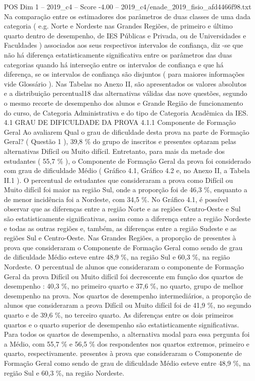 \begin{textsample}{POS Dim 1 – 2019\_c4 – Score -4.00 – 2019\_c4/enade\_2019\_fisio\_afd4466f98.txt}
Na comparação entre os estimadores dos parâmetros de duas classes de uma dada categoria ( e.g.
Norte e Nordeste nas Grandes Regiões, de primeiro e último quarto dentro de desempenho, de IES Públicas e Privada, ou de Universidades e Faculdades ) associados aos seus respectivos intervalos de confiança, diz -se que não há diferença estatisticamente significativa entre os parâmetros das duas categorias quando há interseção entre os intervalos de confiança e que há diferença, se os intervalos de confiança são disjuntos ( para maiores informações vide Glossário ).
Nas Tabelas no Anexo II, são apresentados os valores absolutos e a distribuição percentual18 das alternativas válidas das nove questões, segundo o mesmo recorte de desempenho dos alunos e Grande Região de funcionamento do curso, de Categoria Administrativa e do tipo de Categoria Acadêmica da IES. 4.1 GRAU DE DIFICULDADE DA PROVA 4.1.1 Componente de Formação Geral Ao avaliarem Qual o grau de dificuldade desta prova na parte de Formação Geral? ( Questão 1 ), 39,8 \% do grupo de inscritos e presentes optaram pelas alternativas Difícil ou Muito difícil.
Entretanto, para mais da metade dos estudantes ( 55,7 \% ), o Componente de Formação Geral da prova foi considerado com grau de dificuldade Médio ( Gráfico 4.1, Gráfico 4.2 e, no Anexo II, a Tabela II.1 ).
O percentual de estudantes que consideraram a prova como Difícil ou Muito difícil foi maior na região Sul, onde a proporção foi de 46,3 \%, enquanto a de menor incidência foi a Nordeste, com 34,5 \%.
No Gráfico 4.1, é possível observar que as diferenças entre a região Norte e as regiões Centro-Oeste e Sul são estatisticamente significativas, assim como a diferença entre a região Nordeste e todas as outras regiões e, também, as diferenças entre a região Sudeste e as regiões Sul e Centro-Oeste.
Nas Grandes Regiões, a proporção de presentes à prova que consideraram o Componente de Formação Geral como sendo de grau de dificuldade Médio esteve entre 48,9 \%, na região Sul e 60,3 \%, na região Nordeste.
O percentual de alunos que consideraram o componente de Formação Geral da prova Difícil ou Muito difícil foi decrescente em função dos quartos de desempenho : 40,3 \%, no primeiro quarto e 37,6 \%, no quarto, grupo de melhor desempenho na prova.
Nos quartos de desempenho intermediários, a proporção de alunos que consideraram a prova Difícil ou Muito difícil foi de 41,9 \%, no segundo quarto e de 39,6 \%, no terceiro quarto.
As diferenças entre os dois primeiros quartos e o quarto superior de desempenho são estatisticamente significativas.
Para todos os quartos de desempenho, a alternativa modal para essa pergunta foi a Médio, com 55,7 \% e 56,5 \% dos respondentes nos quartos extremos, primeiro e quarto, respectivamente. presentes à prova que consideraram o Componente de Formação Geral como sendo de grau de dificuldade Médio esteve entre 48,9 \%, na região Sul e 60,3 \%, na região Nordeste.

\end{textsample}

